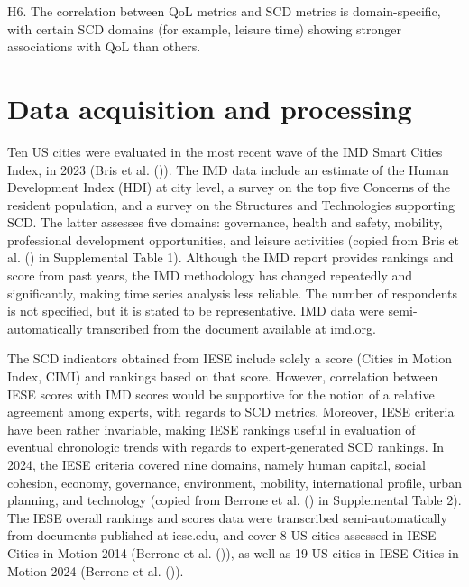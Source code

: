 \documentclass[
  english,
  12pt,
  a4paper,
]{scrartcl}
\begin{document}
H6. The correlation between QoL metrics and SCD metrics is
domain-specific, with certain SCD domains (for example, leisure time)
showing stronger associations with QoL than others.

\section{Data acquisition and
processing}\label{data-acquisition-and-processing}

Ten US cities were evaluated in the most recent wave of the IMD Smart
Cities Index, in 2023 (Bris et al.
()). The IMD data include an
estimate of the Human Development Index (HDI) at city level, a survey on
the top five Concerns of the resident population, and a survey on the
Structures and Technologies supporting SCD. The latter assesses five
domains: governance, health and safety, mobility, professional
development opportunities, and leisure activities (copied from Bris et
al. () in Supplemental Table
1). Although the IMD report provides rankings and score from past years,
the IMD methodology has changed repeatedly and significantly, making
time series analysis less reliable. The number of respondents is not
specified, but it is stated to be representative. IMD data were
semi-automatically transcribed from the document available at imd.org.

The SCD indicators obtained from IESE include solely a score (Cities in
Motion Index, CIMI) and rankings based on that score. However,
correlation between IESE scores with IMD scores would be supportive for
the notion of a relative agreement among experts, with regards to SCD
metrics. Moreover, IESE criteria have been rather invariable, making
IESE rankings useful in evaluation of eventual chronologic trends with
regards to expert-generated SCD rankings. In 2024, the IESE criteria
covered nine domains, namely human capital, social cohesion, economy,
governance, environment, mobility, international profile, urban
planning, and technology (copied from Berrone et al.
() in Supplemental Table
2). The IESE overall rankings and scores data were transcribed
semi-automatically from documents published at iese.edu, and cover 8 US
cities assessed in IESE Cities in Motion 2014 (Berrone et al.
()), as well as 19 US
cities in IESE Cities in Motion 2024 (Berrone et al.
()).
\end{document}
